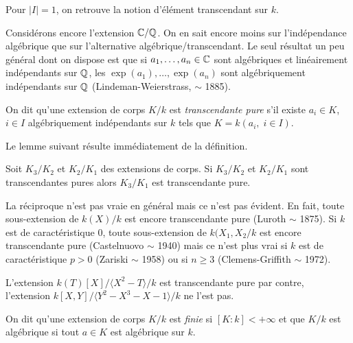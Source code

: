 \begin{remarque}
  Pour $|I|=1$, on retrouve la notion d'élément transcendant sur $k$.\\
\end{remarque}

\begin{exemple}
   Considérons encore l'extension $ \mathbb{C}/\mathbb{Q}$. On en sait encore moins
   sur l'indépendance algébrique que sur l'alternative
   algébrique/transcendant. Le seul résultat un peu général dont on
   dispose est que si $a_1,\dots, a_n\in \mathbb{C}$ sont algébriques et
   linéairement indépendants sur $\mathbb{Q}$, les
   $\exp(a_1),\dots, \exp(a_n)$ sont algébriquement indépendants sur
   $\mathbb{Q}$ (Lindeman-Weierstrass, $\sim$ 1885).
 \end{exemple}

\label{TrPure}
\begin{definition}
  On dit qu'une extension de corps $K/k$ est \textit{transcendante
    pure} s'il existe
  $a_i\in K$, $i\in I$ algébriquement indépendants sur $k$ tels que
  $K=k(a_i,\; i\in I)$.
\end{definition}

Le lemme suivant résulte immédiatement de la définition. \\

\begin{lemme}
  Soit $K_3/K_2$ et $K_2/K_1$ des extensions de corps. Si $K_3/K_2$
  et $K_2/K_1$ sont transcendantes pures alors $K_3/K_1$ est
  transcendante pure.
\end{lemme}

\begin{remarque}
  La réciproque n'est pas vraie en général mais ce n'est pas
  évident. En fait, toute sous-extension de $ k(X)/k$ est encore
  transcendante pure (Luroth $\sim$ 1875). Si $k$ est de
  caractéristique $0$, toute sous-extension de $ k(X_1,X_2/k$ est
  encore transcendante pure (Castelnuovo $\sim$ 1940) mais ce n'est
  plus vrai si $k$ est de caractéristique $p>0$ (Zariski $\sim$ 1958)
  ou si $n\geq 3$ (Clemens-Griffith $\sim$ 1972).
\end{remarque}

\begin{exemple}
  L'extension $k(T)[X]/\langle X^2-T\rangle/k$ est transcendante pure
  par contre, l'extension $k[X,Y]/\langle Y^2-X^3-X-1\rangle/k$ ne
  l'est pas.
\end{exemple}


\begin{definition}
  On dit qu'une extension de corps $K/k$ est
  \textit{finie} si $[K:k] <+\infty$
  et que $K/k$ est algébrique si tout $a\in K$ est algébrique sur $k$.\\
\end{definition}

